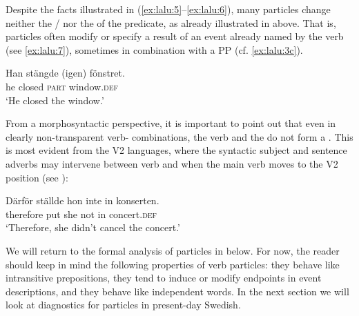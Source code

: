 \documentclass[output=paper]{langscibook}
\begin{document}
\ea\label{ex:lalu:6}
\z
\z

Despite the facts illustrated in (\ref{ex:lalu:5}--\ref{ex:lalu:6}), many particles change neither the \slash {} nor the  of the predicate, as already illustrated in  above. That is, particles often modify or specify a result of an event already named by the verb (see \ref{ex:lalu:7}), sometimes in combination with a PP (cf. \ref{ex:lalu:3c}).


\ea\label{ex:lalu:7}
\gll  Han     stängde   (igen)   fönstret.\\
he       closed     \textsc{part}     window.\textsc{def}\\
\glt `He closed the window.'
\z

From a morphosyntactic perspective, it is important to point out that even in clearly non-transparent verb- combinations, the verb and the  do not form a . This is most evident from the  V2 languages, where the syntactic subject and sentence adverbs may intervene between verb and  when the main verb moves to the V2 position (see \citealt{Afarli1985}):


\ea\label{ex:lalu:8}
\gll  Därför   ställde   hon     inte     in   konserten.\\
therefore  put   she   not     in     concert.\textsc{def}\\
\glt `Therefore, she didn’t cancel the concert.'
\z


We will return to the formal analysis of particles in  below. For now, the reader should keep in mind the following properties of verb particles: they behave like intransitive prepositions, they tend to induce or modify endpoints in event descriptions, and they behave like independent words. In the next section we will look at diagnostics for particles in present-day Swedish.
\end{document}

